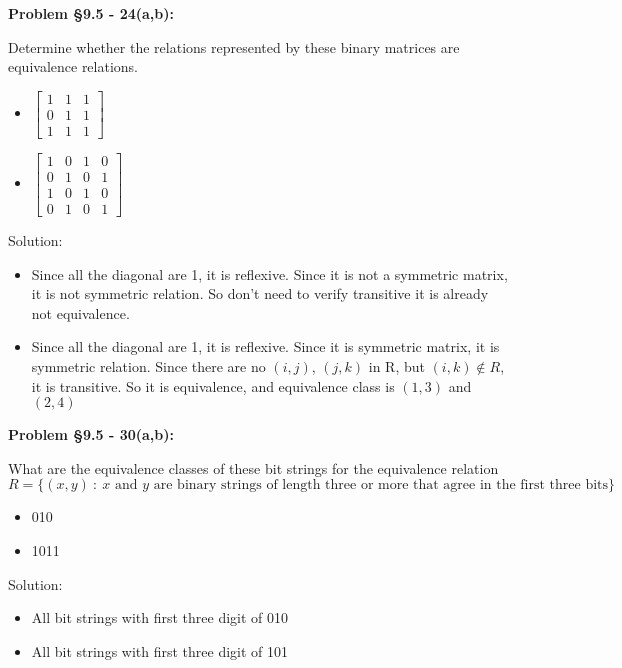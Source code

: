 \documentclass{article}
\newenvironment{problem}[1]
{\begin{mdframed}[default]
\textbf{Problem #1:}
}
{\end{mdframed}
}
\begin{document}
\begin{problem}{\S 9.5 - 24(a,b)}
Determine whether the relations represented by these binary matrices are
equivalence relations.
\begin{itemize}
\item[(a)] $\begin{bmatrix} 1 & 1 & 1 \\ 0 & 1 & 1 \\ 1 & 1 & 1 \end{bmatrix}$
\item[(b)] $\begin{bmatrix} 1 & 0 & 1 & 0 \\ 0 & 1 & 0 & 1 \\ 1 & 0 & 1 & 0 \\
0 & 1 & 0 & 1 \end{bmatrix}$
\end{itemize}
Solution:
\begin{itemize}
    \item[(a)] Since all the diagonal are 1, it is reflexive. Since it is not a symmetric matrix, it is not symmetric relation. So don't need to verify transitive it is already not equivalence.
    \item[(b)] Since all the diagonal are 1, it is reflexive. Since it is symmetric matrix, it is symmetric relation. Since there are no $(i,j)$, $(j,k)$ in R, but $(i,k)\notin R$, it is transitive. So it is equivalence, and equivalence class is $(1,3)$ and $(2,4)$
\end{itemize}
\end{problem}
\begin{problem}{\S 9.5 - 30(a,b)}
What are the equivalence classes of these bit strings for the equivalence relation
\[ R = \{ (x,y)~:~ x \textrm{ and } y \textrm{ are binary strings of length three
or more that agree in the first three bits}\} \]
\begin{itemize}
\item[(a)] 010
\item[(b)] 1011
\end{itemize}
Solution:
\begin{itemize}
    \item[(a)] All bit strings with first three digit of 010
    \item[(b)] All bit strings with first three digit of 101
\end{itemize}
\end{problem}
\end{document}
